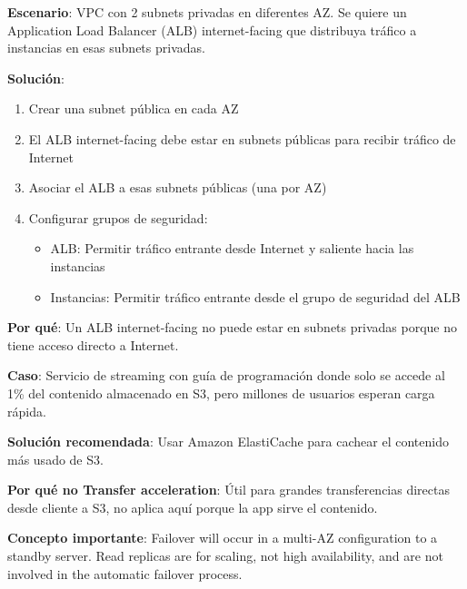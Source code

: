 \documentclass[12pt,a4paper]{report}
\begin{document}
\begin{conceptbox}
\textbf{Escenario}: VPC con 2 subnets privadas en diferentes AZ. Se quiere un Application Load Balancer (ALB) internet-facing que distribuya tráfico a instancias en esas subnets privadas.

\textbf{Solución}:
\begin{enumerate}
    \item Crear una subnet pública en cada AZ
    \item El ALB internet-facing debe estar en subnets públicas para recibir tráfico de Internet
    \item Asociar el ALB a esas subnets públicas (una por AZ)
    \item Configurar grupos de seguridad:
    \begin{itemize}
        \item ALB: Permitir tráfico entrante desde Internet y saliente hacia las instancias
        \item Instancias: Permitir tráfico entrante desde el grupo de seguridad del ALB
    \end{itemize}
\end{enumerate}

\textbf{Por qué}: Un ALB internet-facing no puede estar en subnets privadas porque no tiene acceso directo a Internet.
\end{conceptbox}

\begin{tipbox}
\textbf{Caso}: Servicio de streaming con guía de programación donde solo se accede al 1\% del contenido almacenado en S3, pero millones de usuarios esperan carga rápida.

\textbf{Solución recomendada}: Usar Amazon ElastiCache para cachear el contenido más usado de S3.

\textbf{Por qué no Transfer acceleration}: Útil para grandes transferencias directas desde cliente a S3, no aplica aquí porque la app sirve el contenido.
\end{tipbox}

\begin{warningbox}
\textbf{Concepto importante}: Failover will occur in a multi-AZ configuration to a standby server. Read replicas are for scaling, not high availability, and are not involved in the automatic failover process.
\end{warningbox}
\end{document}
